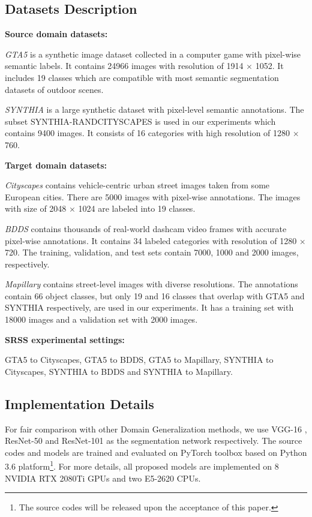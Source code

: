\documentclass[twocolumn,journal,vlined,ruled,linesnumbered]{IEEEtran}
\begin{document}
\subsection{Datasets Description}

\noindent \textbf{Source domain datasets:}

\textit{GTA5} is a synthetic image dataset collected in a computer game with pixel-wise semantic labels. It contains 24966 images with resolution of 1914 $\times$ 1052. It includes 19 classes which are compatible with most semantic segmentation datasets of outdoor scenes.

\textit{SYNTHIA} is a large synthetic dataset with pixel-level semantic annotations. The subset SYNTHIA-RANDCITYSCAPES is used in our experiments which contains 9400 images. It consists of 16 categories with high resolution of 1280 $\times$ 760.

\noindent \textbf{Target domain datasets:}

\textit{Cityscapes} contains vehicle-centric urban street images taken from some European cities. There are 5000 images with pixel-wise annotations. The images with size of 2048 $\times$ 1024 are labeled into 19 classes.

\textit{BDDS} contains thousands of real-world dashcam video frames with accurate pixel-wise annotations. It contains 34 labeled categories with resolution of 1280 $\times$ 720. The training, validation, and test sets contain 7000, 1000 and 2000 images, respectively.

\textit{Mapillary} contains street-level images with diverse resolutions. The annotations contain 66 object classes, but only 19 and 16 classes that overlap with GTA5 and SYNTHIA respectively, are used in our experiments. It has a training set with 18000 images and a validation set with 2000 images.

\noindent \textbf{SRSS experimental settings:}

 GTA5 to Cityscapes,  GTA5 to BDDS,  GTA5 to Mapillary,  SYNTHIA to Cityscapes,  SYNTHIA to BDDS and  SYNTHIA to Mapillary.

\subsection{Implementation Details\label{subsec:Implementation-Details}}

For fair comparison with other Domain Generalization methods, we use VGG-16 \cite{simonyan2014very}, ResNet-50 and ResNet-101 \cite{he2016deep} as the segmentation network respectively. The source codes and models are trained and evaluated on PyTorch toolbox \cite{paszke2019pytorch} based on Python 3.6 platform\footnote{The source codes will be released upon the acceptance of this paper.}. For more details, all proposed models are implemented on 8 NVIDIA RTX 2080Ti GPUs and two E5-2620 CPUs.
\end{document}

